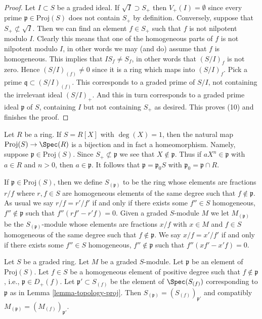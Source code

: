 \begin{proof}
\medskip\noindent
Let $I \subset S$ be a graded ideal.
If $\sqrt{I} \supset S_{+}$ then $V_{+}(I) = \emptyset$ since
every prime $\mathfrak p \in \text{Proj}(S)$ does not contain
$S_{+}$ by definition. Conversely, suppose that
$S_{+} \not \subset \sqrt{I}$. Then we can find an element
$f \in S_{+}$ such that $f$ is not nilpotent modulo $I$.
Clearly this means that one of the homogeneous parts of $f$
is not nilpotent modulo $I$, in other words we may (and do)
assume that $f$ is homogeneous. This implies that
$I S_f \not = S_f$, in other words that $(S/I)_f$ is not
zero. Hence $(S/I)_{(f)} \not = 0$ since it is a ring
which maps into $(S/I)_f$. Pick a prime
$\mathfrak q \subset (S/I)_{(f)}$. This corresponds to
a graded prime of $S/I$, not containing the irrelevant ideal
$(S/I)_{+}$. And this in turn corresponds to a graded prime
ideal $\mathfrak p$ of $S$, containing $I$ but not containing $S_{+}$
as desired. This proves (10) and finishes the proof.
\end{proof}

\begin{example}
\label{example-proj-polynomial-ring-1-variable}
Let $R$ be a ring. If $S = R[X]$ with $\deg(X) = 1$, then the natural map
$\text{Proj}(S) \to \Spec(R)$ is a bijection and in fact a homeomorphism.
Namely, suppose $\mathfrak p \in \text{Proj}(S)$. Since
$S_{+} \not \subset \mathfrak p$ we see that $X \not \in \mathfrak p$.
Thus if $aX^n \in \mathfrak p$ with $a \in R$ and $n > 0$, then
$a \in \mathfrak p$. It follows that $\mathfrak p = \mathfrak p_0S$
with $\mathfrak p_0 = \mathfrak p \cap R$.
\end{example}

\noindent
If $\mathfrak p \in \text{Proj}(S)$, then we
define $S_{(\mathfrak p)}$ to be the ring whose
elements are fractions $r/f$ where $r, f \in S$ are homogeneous
elements of the same degree such that $f \not\in \mathfrak p$.
As usual we say $r/f = r'/f'$ if and only if there exists
some $f'' \in S$ homogeneous, $f'' \not \in \mathfrak p$ such
that $f''(rf' - r'f) = 0$.
Given a graded $S$-module $M$ we let
$M_{(\mathfrak p)}$ be the $S_{(\mathfrak p)}$-module
whose elements are fractions $x/f$ with $x \in M$
and $f \in S$ homogeneous of the same degree such that
$f \not \in \mathfrak p$. We say $x/f = x'/f'$
if and only if there exists some $f'' \in S$ homogeneous,
$f'' \not \in \mathfrak p$ such that $f''(xf' - x'f) = 0$.

\begin{lemma}
\label{lemma-proj-prime}
Let $S$ be a graded ring. Let $M$ be a graded $S$-module.
Let $\mathfrak p$ be an element of $\text{Proj}(S)$.
Let $f \in S$ be a homogeneous element of positive degree
such that $f \not \in \mathfrak p$, i.e., $\mathfrak p \in D_{+}(f)$.
Let $\mathfrak p' \subset S_{(f)}$ be the element of
$\Spec(S_{(f)})$ corresponding to $\mathfrak p$ as in
Lemma \ref{lemma-topology-proj}. Then
$S_{(\mathfrak p)} = (S_{(f)})_{\mathfrak p'}$
and compatibly
$M_{(\mathfrak p)} = (M_{(f)})_{\mathfrak p'}$.
\end{lemma}

